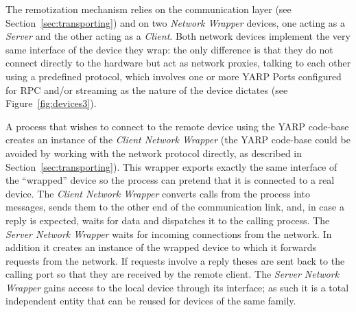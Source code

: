 The remotization mechanism relies on the communication layer 
(see Section~\ref{sec:transporting}) and on two 
\emph{Network Wrapper} devices, 
one acting as a \emph{Server} and the other acting as a \emph{Client}. 
Both network devices implement the very same interface of the device 
they wrap: the only difference is that they 
do not connect directly to the hardware but act as network proxies, 
talking to each other using a predefined protocol, which involves one or more 
YARP Ports configured for RPC and/or streaming
as the nature of the device dictates (see Figure~\ref{fig:devices3}).

A process that wishes to connect to the remote device using
the YARP code-base
creates an instance of the \emph{Client Network Wrapper}
(the YARP code-base could be avoided by working with the network
protocol directly, as described in Section~\ref{sec:transporting}).
%
This wrapper exports 
exactly the same interface of the 
``wrapped'' device so the process can pretend that it is connected to 
a real device. The \emph{Client Network Wrapper} converts calls from 
the process into messages, sends them to the other end of the 
communication link, and, in case a reply is expected, waits for data and 
dispatches it to the calling process. 
%
The \emph{Server Network Wrapper} waits for incoming connections from 
the network. 
In addition it creates an instance of the wrapped 
device to which it forwards requests from the network. If requests
involve a reply theses are sent back to the 
calling port so that they are received by the remote client. The 
\emph{Server Network Wrapper} gains access to the local device through its 
interface; as such it is a total independent 
entity that can be reused for devices of the same family.
%




